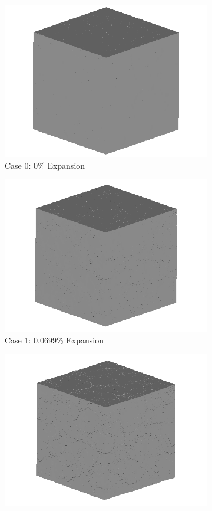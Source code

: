 \begin{figure}[!h]
\centering

    \begin{subfigure}{.5\textwidth}
      \centering
      \includegraphics[width=.8\linewidth]{Files/exp_3D/ASR/A30Undamaged.png}
    \caption{Case 0: 0\% Expansion}
    \end{subfigure}%
    \begin{subfigure}{.5\textwidth}
      \centering
      \includegraphics[width=.8\linewidth]{Files/exp_3D/ASR/A30P75_1_3d.png}
    \caption{Case 1: 0.0699\% Expansion}
    \end{subfigure}
    \begin{subfigure}{.5\textwidth}
      \centering
      \includegraphics[width=.8\linewidth]{Files/exp_3D/ASR/A30P75_2_3d.png}

\end{subfigure}
\end{figure}
